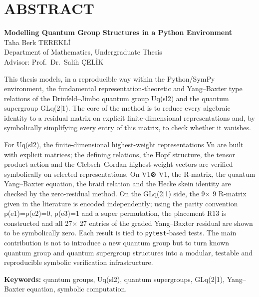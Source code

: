 \documentclass[12pt,a4paper]{report}
\numberwithin{equation}{chapter}
\theoremstyle{plain}
\theoremstyle{definition}
\newcommand{\TezBaslikEN}{Modelling Quantum Group Structures in a Python Environment}
\newcommand{\Ogrenci}{Taha Berk TEREKLİ}
\newcommand{\Danisman}{Prof.\ Dr.\ Salih ÇELİK}
\begin{document}
\chapter{ABSTRACT}
\begin{center}
{\bfseries \TezBaslikEN}\\[4pt]
\Ogrenci\\[8pt]
Department of Mathematics, Undergraduate Thesis\\[6pt]
Advisor: \Danisman\\[10pt]
\end{center}

This thesis models, in a reproducible way within the Python/SymPy environment, the
fundamental representation-theoretic and Yang--Baxter type relations of the
Drinfeld--Jimbo quantum group Uq(sl2) and the quantum supergroup GLq(2|1). The core
of the method is to reduce every algebraic identity to a residual matrix on explicit
finite-dimensional representations and, by symbolically simplifying every entry of
this matrix, to check whether it vanishes.

For Uq(sl2), the finite-dimensional highest-weight representations Vn are built with
explicit matrices; the defining relations, the Hopf structure, the tensor product
action and the Clebsch--Gordan highest-weight vectors are verified symbolically on
selected representations. On V1⊗ V1, the R-matrix, the quantum
Yang--Baxter equation, the braid relation and the Hecke skein identity are checked by
the zero-residual method. On the GLq(2|1) side, the 9× 9 R-matrix given in
the literature is encoded independently; using the parity convention
p(e1)=p(e2)=0, p(e3)=1 and a super permutation, the placement R13 is
constructed and all 27× 27 entries of the graded Yang--Baxter residual are
shown to be symbolically zero. Each result is tied to \texttt{pytest}-based tests. The
main contribution is not to introduce a new quantum group but to turn known quantum
group and quantum supergroup structures into a modular, testable and reproducible
symbolic verification infrastructure.

\vspace{0.6cm}
\noindent\textbf{Keywords:} quantum groups, Uq(sl2), quantum
supergroups, GLq(2|1), Yang--Baxter equation, symbolic computation.
\clearpage

\setcounter{page}{1}
\end{document}

